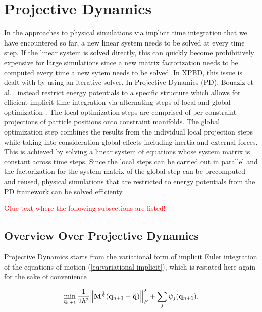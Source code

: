 \section{Projective Dynamics}\label{s:pd}

In the approaches to physical simulations via implicit time integration that we have encountered so far, a new linear system needs to be solved
at every time step. If the linear system is solved directly, this can quickly become prohibitively expensive for large simulations since 
a new matrix factorization needs to be computed every time a new sytem needs to be solved. In XPBD, this issue is dealt with by using an iterative 
solver. In Projective Dynamics (PD), Bouaziz et al.\ \cite{bouaziz2014} instead restrict energy potentials to a specific structure 
which allows for efficient implicit time integration via alternating steps of local and global optimization \cite{bouaziz2014}. The local 
optimization steps are comprised of per-constraint projections of particle positions onto constraint manifolds. The global optimization 
step combines the results from the individual 
local projection steps while taking into consideration global effects including inertia and external forces. This is achieved by solving a 
linear system of equations whose system matrix is constant across time steps. Since the local steps can be carried out in parallel and the 
factorization for the system matrix of the global step can be precomputed and reused, physical simulations that are restricted to energy 
potentials from the PD framework can be solved efficienty.

\textcolor{red}{Glue text where the following subsections are listed!}

\subsection{Overview Over Projective Dynamics}\label{ss:pd-overview}
Projective Dynamics starts from the variational form of implicit Euler integration of the equations of motion (\cref{eq:variational-implicit}),
which is restated here again for the sake of convenience

\begin{equation}\label{eq:pd-variational-implicit}
    \min_{\mathbf{q}_{n+1}} \frac{1}{2h^2} \norm{\mathbf{M}^{\frac{1}{2}}(\mathbf{q}_{n+1} - \tilde{\mathbf{q}})}^2_F + \sum_j \psi_j(\mathbf{q}_{n+1}).
\end{equation}

